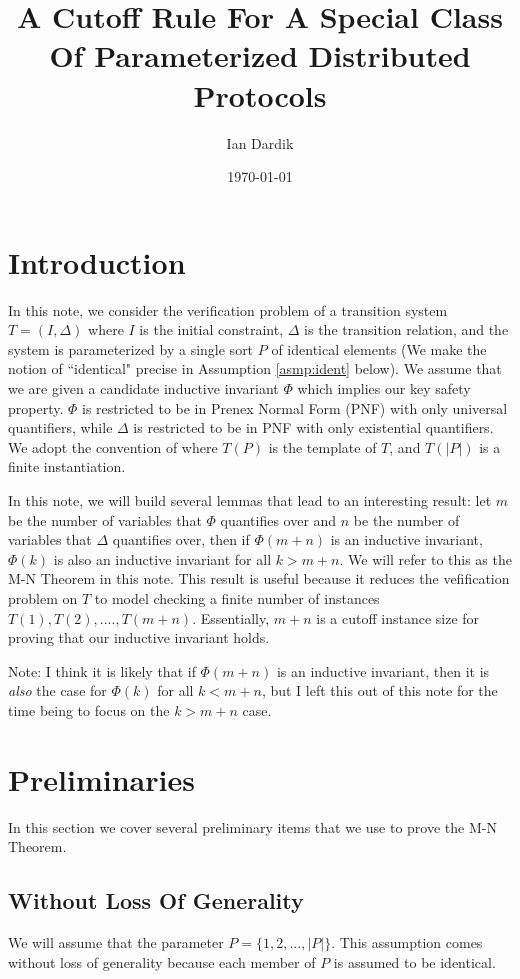 \documentclass[12pt]{article}
\title{A Cutoff Rule For A Special Class Of Parameterized Distributed Protocols}
\author{Ian Dardik}
\date{\today}
\theoremstyle{definition}
\theoremstyle{remark}
\begin{document}
\maketitle

\section{Introduction}
In this note, we consider the verification problem of a transition system $T=(I,\Delta)$ where $I$ is the initial constraint, $\Delta$ is the transition relation, and the system is parameterized by a single sort $P$ of identical elements (We make the notion of ``identical" precise in Assumption \ref{asmp:ident} below).  We assume that we are given a candidate inductive invariant $\Phi$ which implies our key safety property.  $\Phi$ is restricted to be in Prenex Normal Form (PNF) with only universal quantifiers, while $\Delta$ is restricted to be in PNF with only existential quantifiers.  We adopt the convention of \cite{goel2021symmetry} where $T(P)$ is the template of $T$, and $T(|P|)$ is a finite instantiation.

In this note, we will build several lemmas that lead to an interesting result: let $m$ be the number of variables that $\Phi$ quantifies over and $n$ be the number of variables that $\Delta$ quantifies over, then if $\Phi(m+n)$ is an inductive invariant, $\Phi(k)$ is also an inductive invariant for all $k>m+n$.  We will refer to this as the M-N Theorem in this note.  This result is useful because it reduces the vefification problem on $T$ to model checking a finite number of instances $T(1),T(2),....,T(m+n)$.  Essentially, $m+n$ is a cutoff instance size for proving that our inductive invariant holds.

Note: I think it is likely that if $\Phi(m+n)$ is an inductive invariant, then it is \textit{also} the case for $\Phi(k)$ for all $k<m+n$, but I left this out of this note for the time being to focus on the $k>m+n$ case.



\section{Preliminaries}
In this section we cover several preliminary items that we use to prove the M-N Theorem.

\subsection{Without Loss Of Generality}
We will assume that the parameter $P = \{1,2,...,|P|\}$.  This assumption comes without loss of generality because each member of $P$ is assumed to be identical.
\end{document}
